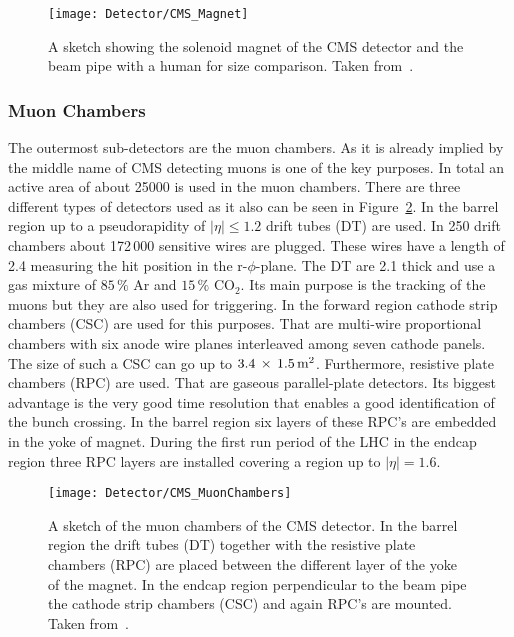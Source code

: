 \begin{figure}[!Hhtb]
  \centering
  \texttt{[image: Detector/CMS\_Magnet]}
  \caption[Sketch of the solenoid magnet]{A sketch showing the solenoid magnet of the CMS detector and the beam pipe with a human for size comparison. Taken from~. \label{plot:LHCCMSMagnetCMS}}
\end{figure}

\subsubsection{Muon Chambers}

The outermost sub-detectors are the muon chambers. As it is already implied by the middle name of CMS detecting muons is one of the key purposes. In total an active area of about 25000\ms{} is used in the muon chambers. There are three different types of detectors used as it also can be seen in Figure~\ref{plot:LHCCMSMuonChambersCMS}. In the barrel region up to a pseudorapidity of $\left|\eta{}\right| \leq{} 1.2$ drift tubes (DT) are used. In 250 drift chambers about 172\,000 sensitive wires are plugged. These wires have a length of 2.4\m{} measuring the hit position in the r-$\phi{}$-plane. The DT are 2.1\cm{} thick and use a gas mixture of $85\,\%$ Ar and $15\,\%$ $\text{CO}_{\text{2}}$. Its main purpose is the tracking of the muons but they are also used for triggering. In the forward region cathode strip chambers (CSC) are used for this purposes. That are multi-wire proportional chambers with six anode wire planes interleaved among seven cathode panels. The size of such a CSC can go up to $3.4\,\times{}\,1.5\,\text{m}^{\text{2}}{}$. Furthermore, resistive plate chambers (RPC) are used. That are gaseous parallel-plate detectors. Its biggest advantage is the very good time resolution that enables a good identification of the bunch crossing. In the barrel region six layers of these RPC's are embedded in the yoke of magnet. During the first run period of the LHC in the endcap region three RPC layers are installed covering a region up to $\left|\eta{}\right| = 1.6$.

\begin{figure}[!Hhtb]
  \centering
  \texttt{[image: Detector/CMS\_MuonChambers]}
  \caption[Sketch of the muon chambers of CMS]{A sketch of the muon chambers of the CMS detector. In the barrel region the drift tubes (DT) together with the resistive plate chambers (RPC) are placed between the different layer of the yoke of the magnet. In the endcap region perpendicular to the beam pipe the cathode strip chambers (CSC) and again RPC's are mounted. Taken from~. \label{plot:LHCCMSMuonChambersCMS}}
\end{figure}


